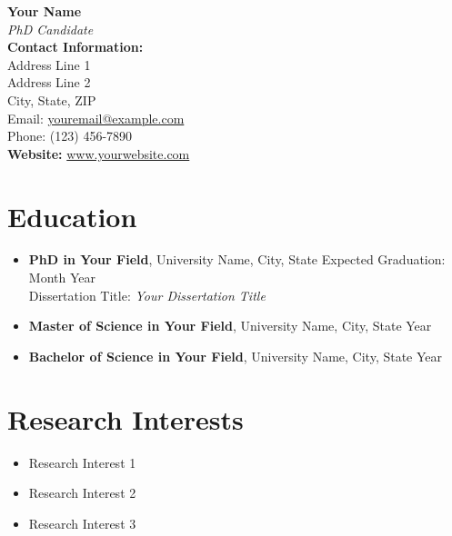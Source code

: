 \documentclass[a4paper,11pt]{article}
\begin{document}
\pagestyle{empty}


\begin{center}
    \textbf{\LARGE Your Name}\\[0.5ex]
    \smallskip
    \textit{PhD Candidate}\\
    \medskip
    \textbf{Contact Information:}\\
    Address Line 1 \\
    Address Line 2 \\
    City, State, ZIP \\
    Email: \href{mailto:youremail@example.com}{youremail@example.com} \\
    Phone: (123) 456-7890 \\
    \smallskip
    \textbf{Website:} \href{http://www.yourwebsite.com}{www.yourwebsite.com}
\end{center}


\section*{Education}

\begin{itemize}[leftmargin=*]
    \item \textbf{PhD in Your Field}, University Name, City, State \hfill Expected Graduation: Month Year \\
    Dissertation Title: \textit{Your Dissertation Title}
    
    \item \textbf{Master of Science in Your Field}, University Name, City, State \hfill Year
    
    \item \textbf{Bachelor of Science in Your Field}, University Name, City, State \hfill Year
\end{itemize}


\section*{Research Interests}

\begin{itemize}[leftmargin=*]
    \item Research Interest 1
    \item Research Interest 2
    \item Research Interest 3
\end{itemize}
\end{document}
